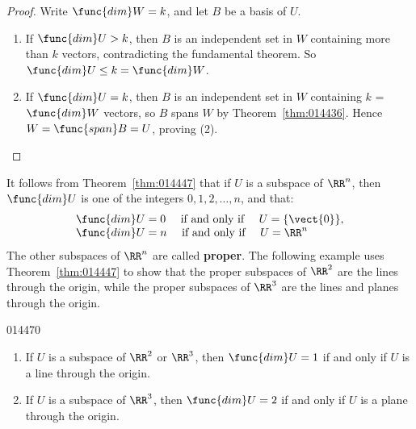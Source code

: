 \begin{proof}
Write $\func{dim} W = k$, and let $B$ be a basis of $U$.

\begin{enumerate}
\item If $\func{dim} U > k$, then $B$ is an independent set in $W$ containing more than $k$ vectors, contradicting the fundamental theorem. So $\func{dim} U \leq k = \func{dim} W$.

\item If $\func{dim} U = k$, then $B$ is an independent set in $W$ containing $k$ = $\func{dim} W$ vectors, so $B$ spans $W$ by Theorem~\ref{thm:014436}. Hence $W = \func{span} B = U$, proving (2).
\end{enumerate}
\vspace*{-2em}\end{proof}

\noindent It follows from Theorem~\ref{thm:014447} that if $U$ is a subspace of $\RR^n$, then $\func{dim} U$ is one of the integers $0, 1, 2, \dots, n$, and that:
\begin{equation*}
\begin{array}{l}
	\func{dim } U = 0 \quad \mbox{ if and only if } \quad U = \{\vect{0}\}, \\
	\func{dim } U = n \quad \mbox{ if and only if } \quad U = \RR^n
\end{array}
\end{equation*}
The other subspaces of $\RR^n$ are called \textbf{proper}. The following example uses Theorem~\ref{thm:014447} to show that the proper subspaces of $\RR^2$ are the lines through the origin, while the proper subspaces of $\RR^3$ are the lines and planes through the origin.

\begin{example}{}{014470}
\begin{enumerate}
\item If $U$ is a subspace of $\RR^2$ or $\RR^3$, then $\func{dim} U = 1$ if and only if $U$ is a line through the origin.

\item If $U$ is a subspace of $\RR^3$, then $\func{dim} U = 2$ if and only if $U$ is a plane through the origin.

\end{enumerate}
\end{example}

